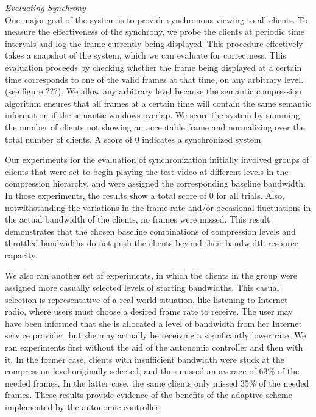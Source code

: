 \documentclass{sig-alternate}
\begin{document}
 

\textit{Evaluating Synchrony} \\ One major goal of the system is to
provide synchronous viewing to all clients.  To measure the
effectiveness of the synchrony, we probe the clients at periodic time
intervals and log the frame currently being displayed.  This procedure
effectively takes a snapshot of the system, which we can evaluate for
correctness.  This evaluation proceeds by checking whether the frame
being displayed at a certain time corresponds to one of the valid
frames at that time, on any arbitrary level.  (see figure ???).  We
allow any arbitrary level because the semantic compression algorithm
ensures that all frames at a certain time will contain the same
semantic information if the semantic windows overlap.  We score the
system by summing the number of clients not showing an acceptable
frame and normalizing over the total number of clients.  A score of 0
indicates a synchronized system.

Our experiments for the evaluation of synchronization initially
involved groups of clients that were set to begin playing the test
video at different levels in the compression hierarchy, and were
assigned the corresponding baseline bandwidth. In those experiments,
the results show a total score of 0 for all trials. Also,
notwithstanding the variations in the frame rate and/or occasional
fluctuations in the actual bandwidth of the clients, no frames were
missed.  This result demonstrates that the chosen baseline
combinations of compression levels and throttled bandwidths do not
push the clients beyond their bandwidth resource capacity.

We also ran another set of experiments, in which the clients in the
group were assigned more casually selected levels of starting
bandwidths.  This casual selection is representative of a real world
situation, like listening to Internet radio, where users must choose a
desired frame rate to receive.  The user may have been informed that
she is allocated a level of bandwidth from her Internet service
provider, but she may actually be receiving a significantly lower rate.
We ran experiments first without the aid of the autonomic controller
and then with it. In the former case, clients with insufficient
bandwidth were stuck at the compression level originally selected, and
thus missed an average of 63\% of the needed frames.  In the latter
case, the same clients only missed 35\% of the needed frames.  These
results provide evidence of the benefits of the adaptive scheme
implemented by the autonomic controller.
\end{document}
